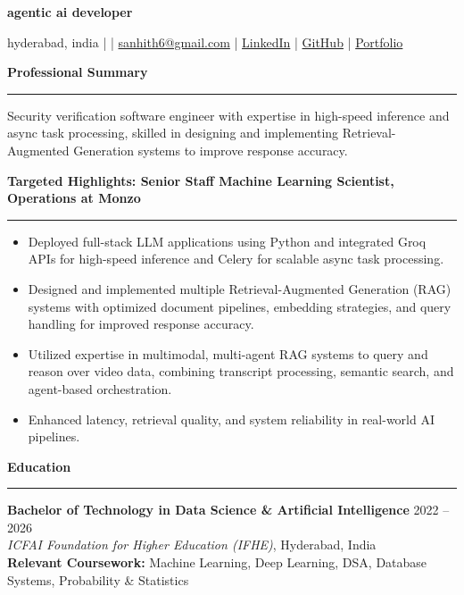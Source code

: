 \documentclass[9pt, letterpaper]{article}
\newcommand{\name}[1]{%
    \begin{center}
        {\LARGE \textbf{#1}}
    \end{center}
}
\newcommand{\sectionheading}[1]{%
    \vspace{4pt}%
    {\large \textbf{#1}}%
    \vspace{1pt}%
    \hrule
    \vspace{2pt}%
}
\begin{document}
\name{agentic ai developer}
\begin{center}
    hyderabad, india \quad |  \quad | \quad
    \href{mailto:sanhith6@gmail.com}{sanhith6@gmail.com} \quad | \quad
    \href{https://www.linkedin.com/in/sanhith-reddy-740a1625b/}{LinkedIn} \quad | \quad
    \href{https://github.com/tsanhith}{GitHub} \quad | \quad
    \href{https://johndoe.dev}{Portfolio}
\end{center}

\vspace{0pt}

\sectionheading{Professional Summary}
Security verification software engineer with expertise in high-speed inference and async task processing, skilled in designing and implementing Retrieval-Augmented Generation systems to improve response accuracy.

\sectionheading{Targeted Highlights: Senior Staff Machine Learning Scientist, Operations at Monzo}
\begin{itemize}[leftmargin=0.25in, itemindent=-0.15in, label={--}]
    \item Deployed full-stack LLM applications using Python and integrated Groq APIs for high-speed inference and Celery for scalable async task processing.
    \item Designed and implemented multiple Retrieval-Augmented Generation (RAG) systems with optimized document pipelines, embedding strategies, and query handling for improved response accuracy.
    \item Utilized expertise in multimodal, multi-agent RAG systems to query and reason over video data, combining transcript processing, semantic search, and agent-based orchestration.
    \item Enhanced latency, retrieval quality, and system reliability in real-world AI pipelines.
\end{itemize}

\sectionheading{Education}
\textbf{Bachelor of Technology in Data Science \& Artificial Intelligence} \hfill 2022 -- 2026 \\
\textit{ICFAI Foundation for Higher Education (IFHE)}, Hyderabad, India \\
\textbf{Relevant Coursework:} Machine Learning, Deep Learning, DSA, Database Systems, Probability \& Statistics
\end{document}
